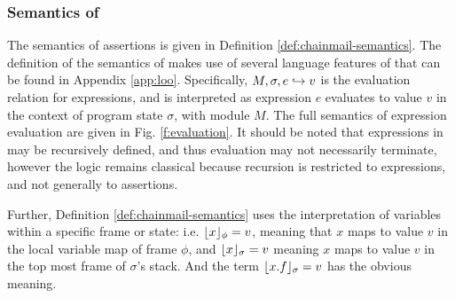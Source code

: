 \subsubsection{Semantics of \SpecO}
The semantics of \SpecO assertions is given in Definition \ref{def:chainmail-semantics}. 
The definition of the semantics of \SpecO makes use of several language features of 
\Loo that can be found in Appendix \ref{app:loo}. Specifically, $M, \sigma, e \hookrightarrow v$
is the evaluation relation for expressions, and is interpreted as expression $e$ evaluates
to value $v$ in the context of program state $\sigma$, with module $M$. The full
semantics of expression evaluation are given in Fig. \ref{f:evaluation}. It should 
be noted that expressions in \Loo may be recursively defined, and thus evaluation may not
necessarily terminate, however the logic remains classical because recursion is restricted
to expressions, and not generally to assertions.

Further, Definition \ref{def:chainmail-semantics} uses the interpretation of variables
within a specific frame or state: i.e. $\lfloor x \rfloor_{\phi} = v$, meaning that $x$ maps to
value $v$ in the local variable map of frame $\phi$, and $\lfloor x \rfloor_{\sigma} = v$ meaning $x$ 
maps to value $v$ in the top most frame of $\sigma$'s stack. And the term  $\lfloor x.f \rfloor_{\sigma} = v$
has the obvious meaning.


